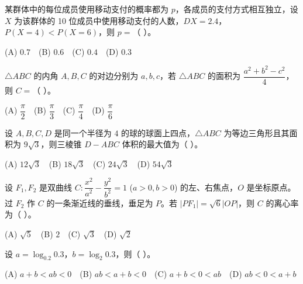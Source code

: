 \begin{question}
某群体中的每位成员使用移动支付的概率都为 $p$，各成员的支付方式相互独立，设 $X$ 为该群体的 10 位成员中使用移动支付的人数，$DX = 2.4$，$P(X = 4) < P(X = 6)$，则 $p =$（ ）。

(A) $0.7$　(B) $0.6$　(C) $0.4$　(D) $0.3$

\end{question}
\begin{question}
$\triangle ABC$ 的内角 $A, B, C$ 的对边分别为 $a, b, c$，若 $\triangle ABC$ 的面积为 $\dfrac{a^2 + b^2 - c^2}{4}$，则 $C =$（ ）。

(A) $\dfrac\pi2$　(B) $\dfrac\pi3$　(C) $\dfrac\pi4$　(D) $\dfrac\pi6$

\end{question}
\begin{question}
设 $A, B, C, D$ 是同一个半径为 $4$ 的球的球面上四点，$\triangle ABC$ 为等边三角形且其面积为 $9\sqrt3$，则三棱锥 $D - ABC$ 体积的最大值为（ ）。

(A) $12\sqrt3$　(B) $18\sqrt3$　(C) $24\sqrt3$　(D) $54\sqrt3$

\end{question}
\begin{question}
设 $F_1, F_2$ 是双曲线 $C: \dfrac{x^2}{a^2} - \dfrac{y^2}{b^2} = 1$ ($a > 0, b > 0$) 的左、右焦点，$O$ 是坐标原点。过 $F_2$ 作 $C$ 的一条渐近线的垂线，垂足为 $P$。若 $|PF_1| = \sqrt6|OP|$，则 $C$ 的离心率为（ ）。

(A) $\sqrt5$　(B) $2$　(C) $\sqrt3$　(D) $\sqrt2$

\end{question}
\begin{question}
设 $a = \log_{0.2} 0.3$，$b = \log_2 0.3$，则（ ）。

(A) $a + b < ab < 0$　(B) $ab < a + b < 0$　(C) $a + b < 0 < ab$　(D) $ab < 0 < a + b$

\par\medskip

\end{question}

